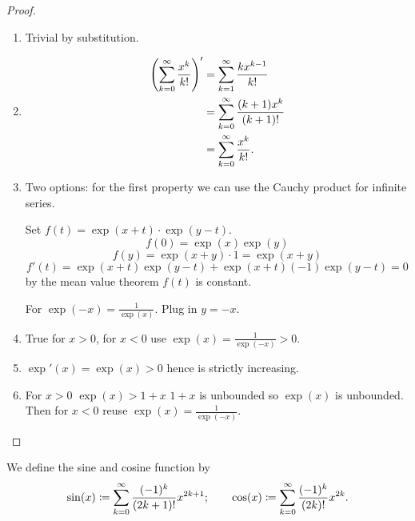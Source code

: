 \begin{proof}\phantom{}
    \begin{enumerate}[label = (\roman*)]
        \item Trivial by substitution.

        \item
        \begin{align*}
            \left(\sum_{k = 0}^{\infty} \frac{x ^ k}{k!}\right)' &= \sum_{k = 1}^{\infty}\frac{kx ^ {k - 1}}{k!} \\
            &= \sum_{k = 0}^{\infty}\frac{(k + 1)x ^ k}{(k + 1)!} \\
            &= \sum_{k = 0}^{\infty}\frac{x ^ k}{k!}.
        \end{align*}

        \item Two options:
        for the first property we can use the Cauchy product for infinite series.

        Set $f(t) = \exp(x + t)\cdot\exp(y - t)$.
        \[
        f(0) = \exp(x)\exp(y)
        \]
        \[
        f(y) = \exp(x + y) \cdot 1 = \exp(x + y)
        \]
        \[
        f'(t) = \exp(x + t)\exp(y - t) + \exp(x + t)(-1)\exp(y - t) = 0
        \]
        by the mean value theorem $f(t)$ is constant.

        For $\exp(-x) = \frac{1}{\exp(x)}$.
        Plug in $y = -x$.

        \item True for $x > 0$,
        for $x < 0$ use $\exp(x) = \frac{1}{\exp(-x)} > 0$.

        \item $\exp'(x) = \exp(x) > 0$ hence is strictly increasing.

        \item For $x > 0$ $\exp(x) > 1 + x$ $1 + x$ is unbounded so $\exp(x)$ is unbounded.
        Then for $x < 0$ reuse $\exp(x) = \frac{1}{\exp(-x)}$.
    \end{enumerate}
\end{proof}

\begin{definition}\label{def:pow_series_sin_cos}
    We define the sine and cosine function by
    \[
    \sin(x) \coloneqq \sum_{k = 0}^{\infty}\frac{(-1) ^ k}{(2k + 1)!}x ^ {2k + 1};\qquad\cos(x) \coloneqq \sum_{k = 0}^{\infty}\frac{(-1) ^ k}{(2k)!}x ^ {2k}.
    \]
\end{definition}

